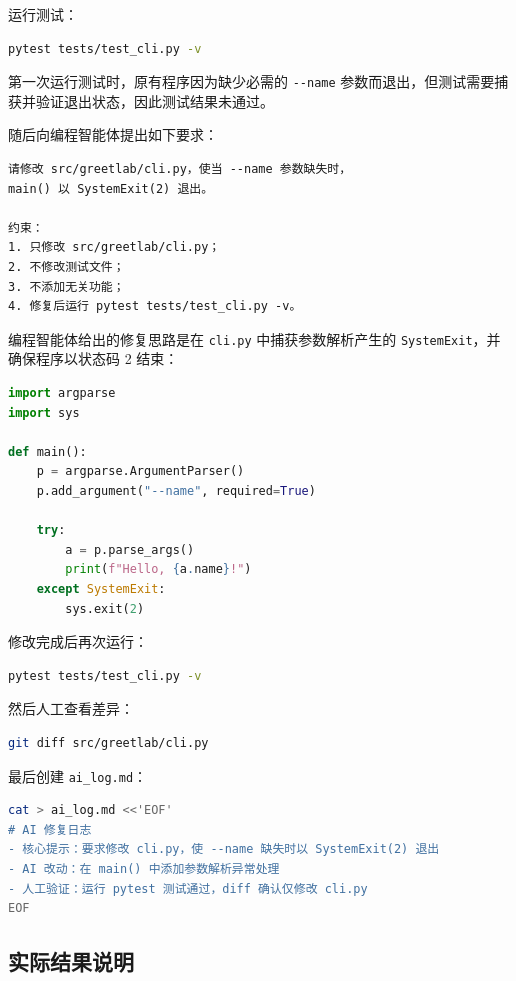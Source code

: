 \documentclass[UTF8,a4paper,12pt]{ctexart}
\begin{document}
运行测试：

\begin{lstlisting}[language=bash]
pytest tests/test_cli.py -v
\end{lstlisting}

第一次运行测试时，原有程序因为缺少必需的 \verb|--name| 参数而退出，但测试需要捕获并验证退出状态，因此测试结果未通过。

随后向编程智能体提出如下要求：

\begin{lstlisting}
请修改 src/greetlab/cli.py，使当 --name 参数缺失时，
main() 以 SystemExit(2) 退出。

约束：
1. 只修改 src/greetlab/cli.py；
2. 不修改测试文件；
3. 不添加无关功能；
4. 修复后运行 pytest tests/test_cli.py -v。
\end{lstlisting}

编程智能体给出的修复思路是在 \verb|cli.py| 中捕获参数解析产生的 \verb|SystemExit|，并确保程序以状态码 2 结束：

\begin{lstlisting}[language=Python]
import argparse
import sys

def main():
    p = argparse.ArgumentParser()
    p.add_argument("--name", required=True)

    try:
        a = p.parse_args()
        print(f"Hello, {a.name}!")
    except SystemExit:
        sys.exit(2)
\end{lstlisting}

修改完成后再次运行：

\begin{lstlisting}[language=bash]
pytest tests/test_cli.py -v
\end{lstlisting}

然后人工查看差异：

\begin{lstlisting}[language=bash]
git diff src/greetlab/cli.py
\end{lstlisting}

最后创建 \verb|ai_log.md|：

\begin{lstlisting}[language=bash]
cat > ai_log.md <<'EOF'
# AI 修复日志
- 核心提示：要求修改 cli.py，使 --name 缺失时以 SystemExit(2) 退出
- AI 改动：在 main() 中添加参数解析异常处理
- 人工验证：运行 pytest 测试通过，diff 确认仅修改 cli.py
EOF
\end{lstlisting}

\subsection*{实际结果说明}
\end{document}
